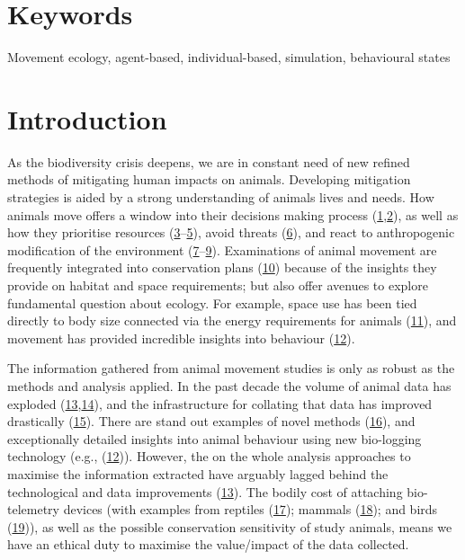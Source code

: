 \documentclass[10pt,a4paper]{article}
\begin{document}
\section*{\color{f1ROrange}Keywords}

Movement ecology, agent-based, individual-based, simulation, behavioural states

\clearpage
\pagestyle{fancy}

\hypertarget{main}{%
\section{Introduction}\label{main}}

As the biodiversity crisis deepens, we are in constant need of new refined methods of mitigating human impacts on animals.
Developing mitigation strategies is aided by a strong understanding of animals lives and needs.
How animals move offers a window into their decisions making process (\protect\hyperlink{ref-Bastille-Rousseau2017}{1},\protect\hyperlink{ref-sridhar_geometry_2021}{2}), as well as how they prioritise resources (\protect\hyperlink{ref-prange_influences_2004}{3}--\protect\hyperlink{ref-vogt_suitability_2018}{5}), avoid threats (\protect\hyperlink{ref-loveridge_landscape_2017}{6}), and react to anthropogenic modification of the environment (\protect\hyperlink{ref-Tucker2018}{7}--\protect\hyperlink{ref-arrondo_invisible_2018}{9}).
Examinations of animal movement are frequently integrated into conservation plans (\protect\hyperlink{ref-Fraser2018}{10}) because of the insights they provide on habitat and space requirements; but also offer avenues to explore fundamental question about ecology.
For example, space use has been tied directly to body size connected via the energy requirements for animals (\protect\hyperlink{ref-noonan_effects_2020}{11}), and movement has provided incredible insights into behaviour (\protect\hyperlink{ref-studd_purrfect_2021}{12}).

The information gathered from animal movement studies is only as robust as the methods and analysis applied.
In the past decade the volume of animal data has exploded (\protect\hyperlink{ref-joo_recent_2022}{13},\protect\hyperlink{ref-wild_internet_2022}{14}), and the infrastructure for collating that data has improved drastically (\protect\hyperlink{ref-kays_movebank_2022}{15}).
There are stand out examples of novel methods (\protect\hyperlink{ref-saunders_radio-tracking_2022}{16}), and exceptionally detailed insights into animal behaviour using new bio-logging technology (e.g., (\protect\hyperlink{ref-studd_purrfect_2021}{12})).
However, the on the whole analysis approaches to maximise the information extracted have arguably lagged behind the technological and data improvements (\protect\hyperlink{ref-joo_recent_2022}{13}).
The bodily cost of attaching bio-telemetry devices (with examples from reptiles (\protect\hyperlink{ref-Weatherhead2004}{17}); mammals (\protect\hyperlink{ref-robstad_impact_2021}{18}); and birds (\protect\hyperlink{ref-portugal_externally_2022}{19})), as well as the possible conservation sensitivity of study animals, means we have an ethical duty to maximise the value/impact of the data collected.
\end{document}
